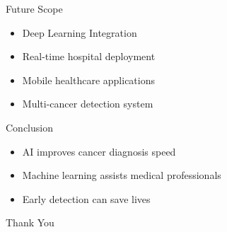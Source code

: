 \documentclass{beamer}
\begin{document}

\begin{frame}{Future Scope}
\begin{itemize}
\item Deep Learning Integration
\item Real-time hospital deployment
\item Mobile healthcare applications
\item Multi-cancer detection system
\end{itemize}
\end{frame}


\begin{frame}{Conclusion}
\begin{itemize}
\item AI improves cancer diagnosis speed
\item Machine learning assists medical professionals
\item Early detection can save lives
\end{itemize}

\vspace{0.5cm}

\centering
\Huge Thank You
\end{frame}
\end{document}
